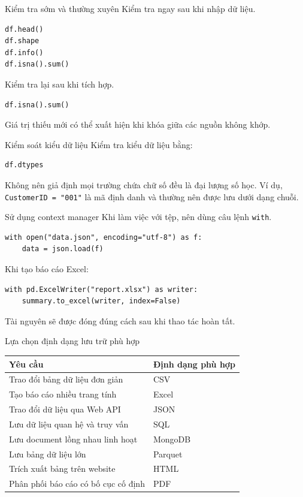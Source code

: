 \documentclass[aspectratio=169,11pt]{beamer}
\newcommand{\code}[1]{\texttt{#1}}
\begin{document}
\begin{frame}[fragile]{Kiểm tra sớm và thường xuyên}
Kiểm tra ngay sau khi nhập dữ liệu.
\begin{lstlisting}[style=pythonstyle]
df.head()
df.shape
df.info()
df.isna().sum()
\end{lstlisting}

Kiểm tra lại sau khi tích hợp.
\begin{lstlisting}[style=pythonstyle]
df.isna().sum()
\end{lstlisting}

Giá trị thiếu mới có thể xuất hiện khi khóa giữa các nguồn không khớp.
\end{frame}

\begin{frame}[fragile]{Kiểm soát kiểu dữ liệu}
Kiểm tra kiểu dữ liệu bằng:
\begin{lstlisting}[style=pythonstyle]
df.dtypes
\end{lstlisting}

Không nên giả định mọi trường chứa chữ số đều là đại lượng số học. Ví dụ, \code{CustomerID = "001"} là mã định danh và thường nên được lưu dưới dạng chuỗi.
\end{frame}

\begin{frame}[fragile]{Sử dụng context manager}
Khi làm việc với tệp, nên dùng câu lệnh \code{with}.

\begin{lstlisting}[style=pythonstyle]
with open("data.json", encoding="utf-8") as f:
    data = json.load(f)
\end{lstlisting}

Khi tạo báo cáo Excel:
\begin{lstlisting}[style=pythonstyle]
with pd.ExcelWriter("report.xlsx") as writer:
    summary.to_excel(writer, index=False)
\end{lstlisting}

Tài nguyên sẽ được đóng đúng cách sau khi thao tác hoàn tất.
\end{frame}

\begin{frame}{Lựa chọn định dạng lưu trữ phù hợp}
\begin{tabularx}{\textwidth}{lX}
\toprule
\textbf{Yêu cầu} & \textbf{Định dạng phù hợp} \\
\midrule
Trao đổi bảng dữ liệu đơn giản & CSV \\
Tạo báo cáo nhiều trang tính & Excel \\
Trao đổi dữ liệu qua Web API & JSON \\
Lưu dữ liệu quan hệ và truy vấn & SQL \\
Lưu document lồng nhau linh hoạt & MongoDB \\
Lưu bảng dữ liệu lớn & Parquet \\
Trích xuất bảng trên website & HTML \\
Phân phối báo cáo có bố cục cố định & PDF \\
\bottomrule
\end{tabularx}
\end{frame}
\end{document}
